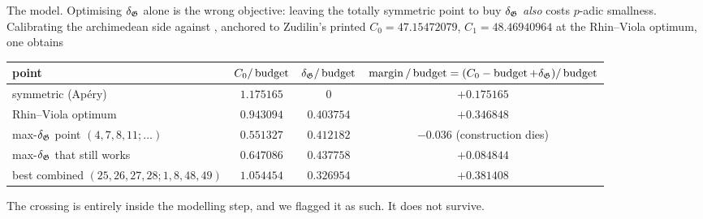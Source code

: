The model. Optimising $\delta_{\mathfrak{G}}$ alone is the wrong objective: leaving the totally symmetric
point to buy $\delta_{\mathfrak{G}}$ \emph{also} costs $p$-adic smallness. Calibrating the archimedean side
against \cite[Lemma 12]{Zudilin2004}, anchored to Zudilin's printed
$C_0=47.15472079$, $C_1=48.46940964$ at the Rhin--Viola optimum, one obtains
\begin{center}
\scriptsize\setlength{\tabcolsep}{4pt}
\begin{tabular}{lccc}
\toprule
point & $C_0/\operatorname{budget}$ & $\delta_{\mathfrak{G}}/\operatorname{budget}$ & $\operatorname{margin}/\operatorname{budget}=(C_0-\operatorname{budget}+\delta_{\mathfrak{G}})/\operatorname{budget}$\\
\midrule
symmetric (Ap\'ery) & $1.175165$ & $0$ & $+0.175165$\\
Rhin--Viola optimum & $0.943094$ & $0.403754$ & $+0.346848$\\
max-$\delta_{\mathfrak{G}}$ point $(4,7,8,11;\dots)$ & $0.551327$ & $0.412182$ & $-0.036$ (construction dies)\\
max-$\delta_{\mathfrak{G}}$ that still works & $0.647086$ & $0.437758$ & $+0.084844$\\
best combined $(25,26,27,28;1,8,48,49)$ & $1.054454$ & $0.326954$ & $\mathbf{+0.381408}$\\
\bottomrule
\end{tabular}
\end{center}

\begin{center}\end{center}

The crossing is entirely inside the modelling step, and we flagged it as such. It does not
survive.

